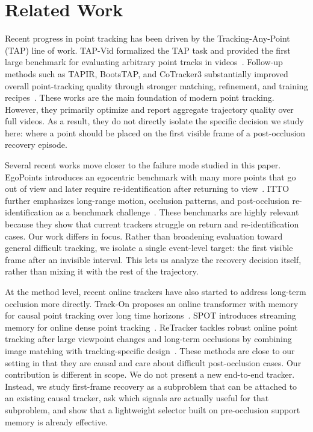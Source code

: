 \documentclass[10pt,journal,compsoc]{IEEEtran}
\begin{document}
\section{Related Work}
\label{sec:related}

Recent progress in point tracking has been driven by the Tracking-Any-Point (TAP) line of work. TAP-Vid formalized the TAP task and provided the first large benchmark for evaluating arbitrary point tracks in videos~\cite{doersch2022tapvid}. Follow-up methods such as TAPIR, BootsTAP, and CoTracker3 substantially improved overall point-tracking quality through stronger matching, refinement, and training recipes~\cite{doersch2023tapir,sundaram2024bootstapir,karaev2024cotracker3}. These works are the main foundation of modern point tracking. However, they primarily optimize and report aggregate trajectory quality over full videos. As a result, they do not directly isolate the specific decision we study here: where a point should be placed on the first visible frame of a post-occlusion recovery episode.

Several recent works move closer to the failure mode studied in this paper. EgoPoints introduces an egocentric benchmark with many more points that go out of view and later require re-identification after returning to view~\cite{darkhalil2025egopoints}. ITTO further emphasizes long-range motion, occlusion patterns, and post-occlusion re-identification as a benchmark challenge~\cite{itto2025}. These benchmarks are highly relevant because they show that current trackers struggle on return and re-identification cases. Our work differs in focus. Rather than broadening evaluation toward general difficult tracking, we isolate a single event-level target: the first visible frame after an invisible interval. This lets us analyze the recovery decision itself, rather than mixing it with the rest of the trajectory.

At the method level, recent online trackers have also started to address long-term occlusion more directly. Track-On proposes an online transformer with memory for causal point tracking over long time horizons~\cite{trackon2025}. SPOT introduces streaming memory for online dense point tracking~\cite{dong2025spot}. ReTracker tackles robust online point tracking after large viewpoint changes and long-term occlusions by combining image matching with tracking-specific design~\cite{tan2025retracker}. These methods are close to our setting in that they are causal and care about difficult post-occlusion cases. Our contribution is different in scope. We do not present a new end-to-end tracker. Instead, we study first-frame recovery as a subproblem that can be attached to an existing causal tracker, ask which signals are actually useful for that subproblem, and show that a lightweight selector built on pre-occlusion support memory is already effective.
\end{document}
